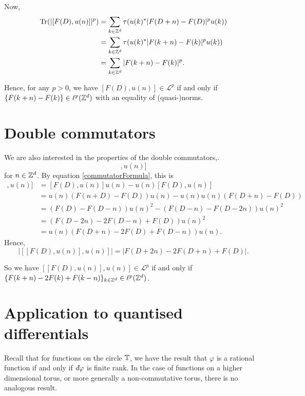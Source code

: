 Now,
\begin{align}
    \operatorname{Tr}(|[F(D),u(n)]|^p) &= \sum_{k \in \mathbb{Z}^d} \tau(u(k)^*|F(D+n)-F(D)|^pu(k))\\
    &= \sum_{k \in \mathbb{Z}^d} \tau(u(k)^*|F(k+n)-F(k)|^pu(k))\\
    &= \sum_{k \in \mathbb{Z}^d} |F(k+n)-F(k)|^p.
\end{align}

Hence, for any $p > 0$, we have $[F(D),u(n)] \in \mathcal{L}^p$ if and only if
$\{F(k+n)-F(k)\} \in \ell^p(\mathbb{Z}^d)$ with an equality of (quasi-)norms.


\section{Double commutators}

We are also interested in the properties of the double commutators,.
\begin{equation*}
    [[F(D),u(n)],u(n)]
\end{equation*}
for $n \in \mathbb{Z}^d$. By equation \ref{commutatorFormula}, this is
\begin{align}
    [[F(D),u(n)],u(n)] &= [F(D),u(n)]u(n) - u(n)[F(D),u(n)] \\
                       &= u(n)(F(n+D)-F(D))u(n)-u(n)u(n)(F(D+n)-F(D))\\
                       &= (F(D)-F(D-n))u(n)^2-(F(D-n)-F(D-2n))u(n)^2\\
                       &= (F(D-2n)-2F(D-n)+F(D))u(n)^2\\
                       &= u(n)(F(D+n)-2F(D)+F(D-n))u(n).
\end{align}
Hence,
\begin{equation*}
    |[[F(D),u(n)],u(n)]| = |F(D+2n)-2F(D+n)+F(D)|.
\end{equation*}

So we have $[[F(D),u(n)],u(n)] \in \mathcal{L}^p$
if and only if $\{F(k+n)-2F(k)+F(k-n)\}_{k\in \mathbb{Z}^d} \in \ell^p(\mathbb{Z}^d)$.

\section{Application to quantised differentials}
Recall that for functions on the circle $\mathbb{T}$, we have the result
that $\varphi$ is a rational function if and only if $\qd \varphi$
is finite rank. In the case of functions on a higher dimensional
torus, or more generally a non-commutative torus, there is no analogous
result.

